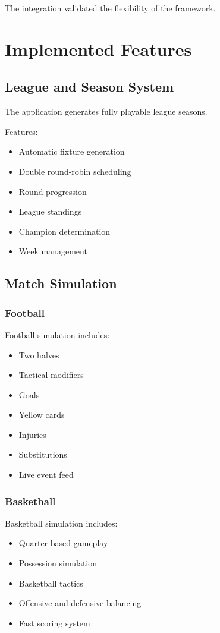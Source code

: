 \documentclass[11pt,a4paper]{article}
\begin{document}
The integration validated the flexibility of the framework.

\section{Implemented Features}

\subsection{League and Season System}

The application generates fully playable league seasons.

Features:
\begin{itemize}
\item Automatic fixture generation
\item Double round-robin scheduling
\item Round progression
\item League standings
\item Champion determination
\item Week management
\end{itemize}

\subsection{Match Simulation}

\subsubsection*{Football}

Football simulation includes:
\begin{itemize}
\item Two halves
\item Tactical modifiers
\item Goals
\item Yellow cards
\item Injuries
\item Substitutions
\item Live event feed
\end{itemize}

\subsubsection*{Basketball}

Basketball simulation includes:
\begin{itemize}
\item Quarter-based gameplay
\item Possession simulation
\item Basketball tactics
\item Offensive and defensive balancing
\item Fast scoring system
\end{itemize}
\end{document}
